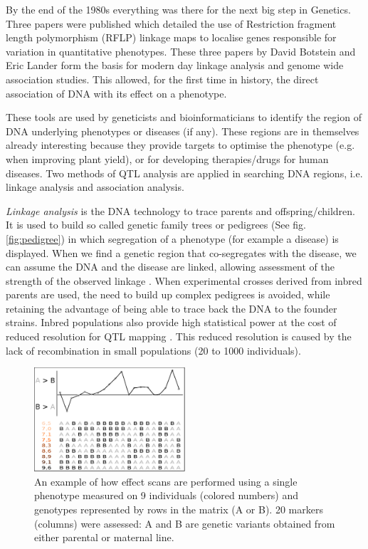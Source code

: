 By the end of the 1980s everything was there for the next big step in Genetics. Three papers were published which detailed 
the use of Restriction fragment length polymorphism (RFLP) linkage maps to localise genes responsible for variation in 
quantitative phenotypes. These three papers by David Botstein and Eric Lander \cite{Lander:1986, Lander:1987, Lander:1989} 
form the basis for modern day linkage analysis and genome wide association studies. This allowed, for the first time in 
history, the direct association of DNA with its effect on a phenotype. 

These tools are used by geneticists and bioinformaticians to identify the region of DNA underlying phenotypes or diseases 
(if any). These regions are in themselves already interesting because they provide targets to optimise the phenotype (e.g. 
when improving plant yield), or for developing therapies/drugs for human diseases. Two methods of QTL analysis are applied 
in searching  DNA regions, i.e. linkage analysis and association analysis. 

\emph{Linkage analysis} is the DNA technology to trace parents and offspring/children. It is used to build so called genetic 
family trees or pedigrees (See fig. \ref{fig:pedigree}) in which segregation of a phenotype (for example a disease) is 
displayed. When we find a genetic region that co-segregates with the disease, we can assume the DNA and the disease are 
linked, allowing assessment of the strength of the observed linkage \cite{Rosyara:2009}. When experimental crosses derived 
from inbred parents are used, the need to build up complex pedigrees is avoided, while retaining the advantage of being able 
to trace back the DNA to the founder strains. Inbred populations also provide high statistical power at the cost of reduced 
resolution for QTL mapping \cite{Jansen:2001a}. This reduced resolution is caused by the lack of recombination in small 
populations (20 to 1000 individuals). 

\begin{figure}
  \centering
  \includegraphics[width=0.5\textwidth]{eps/image_1_1}
  \caption[Effect scan across the genome.]
    {An example of how effect scans are performed using a single phenotype measured on 9 individuals (colored numbers)
    and genotypes represented by rows in the matrix (A or B). 20 markers (columns) were assessed: A and B are genetic 
    variants obtained from either parental or maternal line. }
    \label{fig:effectscan}
\end{figure}

